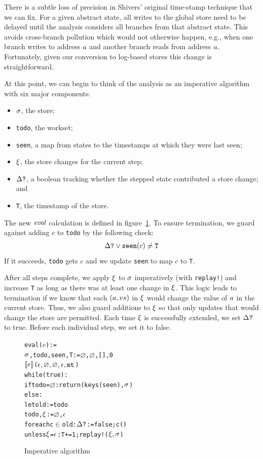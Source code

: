 \documentclass[preprint,onecolumn,9pt]{sigplanconf} %
\begin{document}
There is a subtle loss of precision in Shivers' original time-stamp
technique that we can fix. For a given abstract state, all writes to
the global store need to be delayed until the analysis considers all
branches from that abstract state. This avoids cross-branch pollution
which would not otherwise happen, e.g., when one branch writes to
address $a$ and another branch reads from address
$a$. Fortunately, given our conversion to log-based stores this
change is straightforward.

At this point, we can begin to think of the analysis as an imperative
algorithm with six major components:
%
\begin{itemize}
 \item{$\sigma$, the store;}
 \item{{\tt todo}, the workset;}
 \item{{\tt seen}, a map from states to the timestamps at which they were last seen;}
 \item{$\xi$, the store changes for the current step;}
 \item{$\Delta\mbox{{\tt ?}}$, a boolean tracking whether the stepped state contributed a store change; and}
 \item{{\tt T}, the timestamp of the store.}
\end{itemize}

The new $\mathit{eval}$ calculation is defined in
figure~\ref{fig:imperative}.  To ensure termination, we guard against adding
$c$ to {\tt todo} by the following check:
\begin{align*}\Delta\mbox{{\tt ?}} \vee {\tt seen}(c) \neq {\tt T}\end{align*}
If it succeeds, {\tt todo} gets $c$ and we update {\tt seen} to map $c$ to {\tt T}.

After all steps complete, we apply $\xi$ to $\sigma$ imperatively
(with {\tt replay!}) and increase {\tt T} as long as there was at
least one change in $\xi$. This logic leads to termination if we
know that each $(a, v{s})$ in $\xi$ would change
the value of $a$ in the current store. Thus, we also guard
additions to $\xi$ so that only updates that would change the
store are permitted. Each time $\xi$ is successfully extended, we
set $\Delta\mbox{{\tt ?}}$ to true. Before each individual step, we set it
to false.

\begin{figure}
\begin{alltt}
eval(\(e\)) :=
  \(\msto\), todo, seen, T := \(\varnothing\), \(\varnothing\), [], 0
  \(\compile{e}\)(\(\mtcntr, \varnothing, \varnothing, \mtlst, \kmt\))
  while(true):
    if todo = \(\varnothing\): return (keys(seen), \(\msto\))
    else:
      let old := todo
      todo, \(\msdiff\) := \(\varnothing\), \(\mtlst\)
      foreach c \(\in\) old: \(\changep\) := false; c()
      unless \(\msdiff\) = \(\mtlst\): T += 1; replay!(\(\msdiff, \msto\))
\end{alltt}
\caption{Imperative algorithm}
\label{fig:imperative}
\end{figure}
\end{document}
